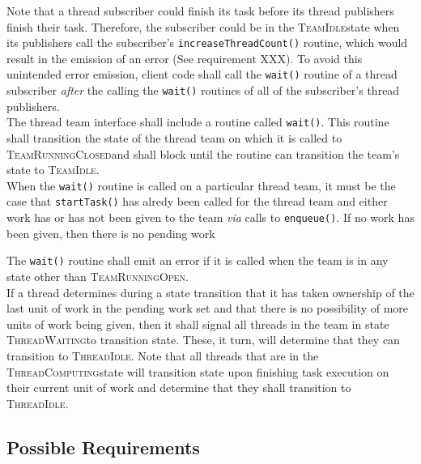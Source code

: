 \documentclass{article}
\newcommand{\TeamIdle}          {\textsc{TeamIdle}}
\newcommand{\TeamRunningOpen}   {\textsc{TeamRunningOpen}}
\newcommand{\TeamRunningClosed} {\textsc{TeamRunningClosed}}
\newcommand{\ThreadIdle}        {\textsc{ThreadIdle}}
\newcommand{\ThreadComputing}   {\textsc{ThreadComputing}}
\newcommand{\ThreadWaiting}     {\textsc{ThreadWaiting}}
\begin{document}
Note that a thread subscriber could finish its task before its thread
publishers finish their task.  Therefore, the subscriber could be in the
\TeamIdle state when its publishers call the subscriber's
\texttt{increaseThreadCount()} routine, which would result in the emission of an
error (See requirement XXX).  To avoid this unintended error emission, client code shall call the
\texttt{wait()} routine of a thread subscriber \emph{after} the calling the
\texttt{wait()} routines of all of the subscriber's thread publishers.\\

The thread team interface shall include a routine called \texttt{wait()}.  This
routine shall transition the state of the thread team on which it is called to
\TeamRunningClosed and shall block until the routine can transition the team's
state to \TeamIdle.\\

When the \texttt{wait()} routine is called on a particular thread team, it must
be the case that \texttt{startTask()} has alredy been called for the thread team
and either work has or has not been given to the team \textit{via} calls to
\texttt{enqueue()}.  If no work has been given, then there is no pending work

The \texttt{wait()} routine shall emit an error if it is called when the team is
in any state other than \TeamRunningOpen.\\

If a thread determines during a state transition that it has taken ownership of
the last unit of work in the pending work set and that there is no possibility
of more units of work being given, then it shall signal all threads in the team
in state \ThreadWaiting to transition state.  These, it turn, will determine that
they can transition to \ThreadIdle.  Note that all threads that are in the
\ThreadComputing state will transition state upon finishing task execution on
their current unit of work and determine that they shall transition to
\ThreadIdle.\\

\subsection{Possible Requirements}
\end{document}

